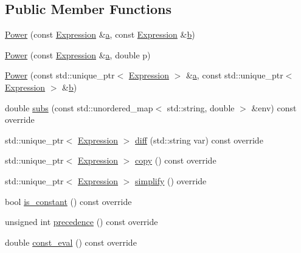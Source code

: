 \subsection*{Public Member Functions}
\begin{DoxyCompactItemize}
\item 
\hyperlink{classsymcpp_1_1Power_a2771cf0de9510c3e3d09476504c608f4}{Power} (const \hyperlink{classsymcpp_1_1Expression}{Expression} \&\hyperlink{classsymcpp_1_1Power_aa36a8b5499b378ec9bd705ea9a9e77ce}{a}, const \hyperlink{classsymcpp_1_1Expression}{Expression} \&\hyperlink{classsymcpp_1_1Power_add4b954bcfa942f2d14ed40713d92ad8}{b})
\item 
\hyperlink{classsymcpp_1_1Power_a1d97fafc9c111460aa8690951045f214}{Power} (const \hyperlink{classsymcpp_1_1Expression}{Expression} \&\hyperlink{classsymcpp_1_1Power_aa36a8b5499b378ec9bd705ea9a9e77ce}{a}, double p)
\item 
\hyperlink{classsymcpp_1_1Power_a5c32ae8501d643bbbe846f08563bac44}{Power} (const std\+::unique\+\_\+ptr$<$ \hyperlink{classsymcpp_1_1Expression}{Expression} $>$ \&\hyperlink{classsymcpp_1_1Power_aa36a8b5499b378ec9bd705ea9a9e77ce}{a}, const std\+::unique\+\_\+ptr$<$ \hyperlink{classsymcpp_1_1Expression}{Expression} $>$ \&\hyperlink{classsymcpp_1_1Power_add4b954bcfa942f2d14ed40713d92ad8}{b})
\item 
double \hyperlink{classsymcpp_1_1Power_a0cf64595eca511f6a83317f47754bd58}{subs} (const std\+::unordered\+\_\+map$<$ std\+::string, double $>$ \&env) const override
\item 
std\+::unique\+\_\+ptr$<$ \hyperlink{classsymcpp_1_1Expression}{Expression} $>$ \hyperlink{classsymcpp_1_1Power_ac8fdf5b0ddfa04647ba93a6c383d4a7b}{diff} (std\+::string var) const override
\item 
std\+::unique\+\_\+ptr$<$ \hyperlink{classsymcpp_1_1Expression}{Expression} $>$ \hyperlink{classsymcpp_1_1Power_ac628b9070382bde67b838f291f81ddc4}{copy} () const override
\item 
std\+::unique\+\_\+ptr$<$ \hyperlink{classsymcpp_1_1Expression}{Expression} $>$ \hyperlink{classsymcpp_1_1Power_aa6411b410decc9778640feaa7d173349}{simplify} () override
\item 
bool \hyperlink{classsymcpp_1_1Power_af90cd850099fda788416ab5aa9e752e2}{is\+\_\+constant} () const override
\item 
unsigned int \hyperlink{classsymcpp_1_1Power_a1287f36d506b82695187beae3f3c9a5e}{precedence} () const override
\item 
double \hyperlink{classsymcpp_1_1Power_ac344573e85b3db4a324ba3635244c8ca}{const\+\_\+eval} () const override
\end{DoxyCompactItemize}
